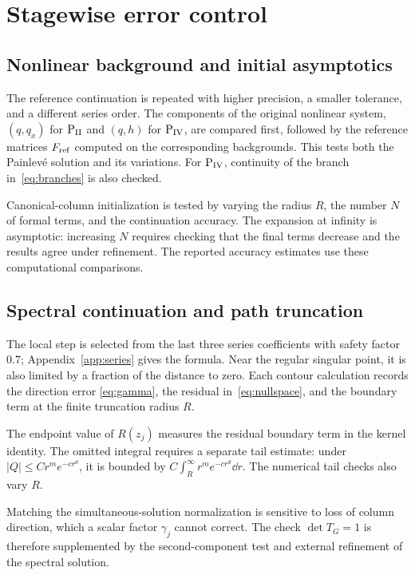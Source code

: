 \section{Stagewise error control}\label{sec:error}
\subsection{Nonlinear background and initial asymptotics}
The reference continuation is repeated with higher precision, a smaller
tolerance, and a different series order. The components of the original
nonlinear system, $(q,q_x)$ for $\mathrm{P}_{\mathrm{II}}$ and $(q,h)$ for $\mathrm{P}_{\mathrm{IV}}$, are
compared first, followed by the reference matrices $F_{\rm ref}$
computed on the corresponding backgrounds. This tests both the
Painlev\'e solution and its variations. For $\mathrm{P}_{\mathrm{IV}}$, continuity of the
branch in~\eqref{eq:branches} is also checked.

Canonical-column initialization is tested by varying the radius $R$,
the number $N$ of formal terms, and the continuation accuracy.
The expansion at infinity is asymptotic: increasing $N$ requires checking
that the final terms decrease and the results agree under refinement.
The reported accuracy estimates use these computational comparisons.

\subsection{Spectral continuation and path truncation}
The local step is selected from the last three series coefficients with
safety factor $0.7$; Appendix~\ref{app:series} gives the formula.
Near the regular singular point, it is also limited by a fraction of the
distance to zero. Each contour calculation records the direction error
\eqref{eq:gamma}, the residual in~\eqref{eq:nullspace}, and the boundary
term at the finite truncation radius $R$.

The endpoint value of $R(z_j)$ measures the residual boundary term in
the kernel identity. The omitted integral requires a separate tail
estimate: under $|Q|\le C r^m e^{-c r^d}$, it is bounded by
$C\int_R^\infty r^m e^{-cr^d}\dd r$. The numerical tail checks also
vary $R$.

Matching the simultaneous-solution normalization is sensitive to loss
of column direction, which a scalar factor $\gamma_j$ cannot correct.
The check $\det T_G=1$ is therefore supplemented by the second-component
test and external refinement of the spectral solution.

